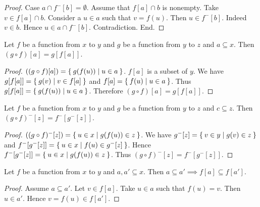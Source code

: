 \documentclass[../../set-theory.ftl.tex]{subfiles}
\begin{document}
\begin{forthel}
\begin{proof}
      Case $a \cap f^{-}[b] = \emptyset$.
        Assume that $f[a] \cap b$ is nonempty.
        Take $v \in f[a] \cap b$.
        Consider a $u \in a$ such that $v = f(u)$.
        Then $u \in f^{-}[b]$.
        Indeed $v \in b$.
        Hence $u \in a \cap f^{-}[b]$.
        Contradiction.
      End.
    \end{proof}

    \begin{proposition}\label{SetTheory_02_02_522811}
      Let $f$ be a function from $x$ to $y$ and $g$ be a function from $y$ to $z$ and $a \subseteq x$.
      Then $(g \circ f)[a] = g[f[a]]$.
    \end{proposition}
    \begin{proof}
      $((g \circ f)[a]) = \Set{g(f(u)) | u \in a}$.
      $f[a]$ is a subset of $y$.
      We have $g[f[a]] = \Set{g(v) | v \in f[a]}$ and $f[a] = \Set{f(u) | u \in a}$.
      Thus $g[f[a]] = \Set{g(f(u)) | u \in a}$.
      Therefore $(g \circ f)[a] = g[f[a]]$.
    \end{proof}

    \begin{proposition}\label{SetTheory_02_02_819065}
      Let $f$ be a function from $x$ to $y$ and $g$ be a function from $y$ to $z$ and $c \subseteq z$.
      Then $(g \circ f)^{-}[z] = f^{-}[g^{-}[z]]$.
    \end{proposition}
    \begin{proof}
      $((g \circ f)^{-}[z]) = \Set{u \in x | g(f(u)) \in z}$.
      We have $g^{-}[z] = \Set{v \in y | g(v) \in z}$ and $f^{-}[g^{-}[z]] = \Set{u \in x | f(u) \in g^{-}[z]}$.
      Hence $f^{-}[g^{-}[z]] = \Set{u \in x | g(f(u)) \in z}$.
      Thus $(g \circ f)^{-}[z] = f^{-}[g^{-}[z]]$.
    \end{proof}

    \begin{proposition}\label{SetTheory_02_02_889945}
      Let $f$ be a function from $x$ to $y$ and $a,a' \subseteq x$.
      Then $a \subseteq a' \implies f[a] \subseteq f[a']$.
    \end{proposition}
    \begin{proof}
      Assume $a \subseteq a'$.
      Let $v \in f[a]$.
      Take $u \in a$ such that $f(u) = v$.
      Then $u \in a'$.
      Hence $v = f(u) \in f[a']$.
    \end{proof}


\end{forthel}
\end{document}
